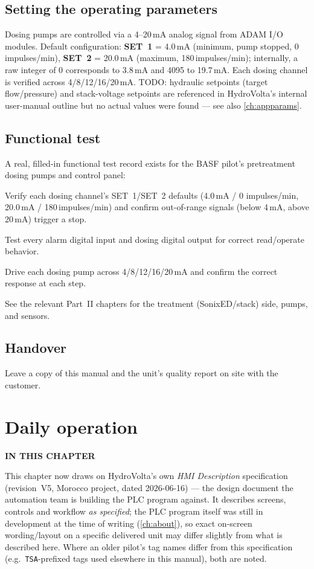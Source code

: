 \documentclass[a4paper,11pt,twoside,openright,numbers=noenddot]{scrreprt}
\newcommand{\chaptertoc}{%
  \begingroup
  \etocsetnexttocdepth{1}%
  \etocsettocstyle
    {{\sffamily\bfseries\footnotesize\color{hvmuted}IN THIS CHAPTER\par}%
     \vspace{5pt}{\color{hvink}\rule{\linewidth}{1.2pt}}\par\vspace{2pt}}{}%
  \etocsetstyle{section}{}{}
    {\par\vspace{4pt}\noindent
     \makebox[11mm][l]{\sffamily\bfseries\small\color{hvprimary}\etocnumber}%
     \sffamily\small\etocname\hfill{\color{hvmuted}\etocpage}%
     \par\vspace{4pt}{\color{hvrule}\rule{\linewidth}{0.4pt}}}{}%
  \localtableofcontents
  \endgroup}
\newcommand{\sonixed}{SonixED\texttrademark\xspace}
\begin{document}
\section{Setting the operating parameters}
\label{sec:opparams}
Dosing pumps are controlled via a 4--20\,mA analog signal from ADAM I/O
modules. Default configuration: \textbf{SET~1} = 4.0\,mA (minimum, pump
stopped, 0 impulses/min), \textbf{SET~2} = 20.0\,mA (maximum,
180\,impulses/min); internally, a raw integer of 0 corresponds to 3.8\,mA
and 4095 to 19.7\,mA. Each dosing channel is verified across 4/8/12/16/20\,mA.
TODO: hydraulic setpoints (target flow/pressure) and stack-voltage
setpoints are referenced in HydroVolta's internal user-manual outline but
no actual values were found --- see also \cref{ch:appparams}.

\section{Functional test}
A real, filled-in functional test record exists for the BASF pilot's
pretreatment dosing pumps and control panel:
\begin{procedure}
\item Verify each dosing channel's SET~1/SET~2 defaults (4.0\,mA / 0
  impulses/min, 20.0\,mA / 180\,impulses/min) and confirm out-of-range
  signals (below 4\,mA, above 20\,mA) trigger a stop.
\item Test every alarm digital input and dosing digital output for correct
  read/operate behavior.
\item Drive each dosing pump across 4/8/12/16/20\,mA and confirm the
  correct response at each step.
\end{procedure}
See the relevant Part~II chapters for the treatment (\sonixed/stack) side,
pumps, and sensors.

\section{Handover}
Leave a copy of this manual and the unit's quality report on site with
the customer.


\chapter{Daily operation}
\label{ch:operation}
\chaptertoc

\begin{note}
This chapter now draws on HydroVolta's own \emph{HMI Description}
specification (revision~V5, Morocco project, dated 2026-06-16) --- the
design document the automation team is building the PLC program against.
It describes screens, controls and workflow \emph{as specified}; the PLC
program itself was still in development at the time of writing
(\cref{ch:about}), so exact on-screen wording/layout on a specific
delivered unit may differ slightly from what is described here. Where an
older pilot's tag names differ from this specification (e.g.\
\texttt{TSA}-prefixed tags used elsewhere in this manual), both are noted.
\end{note}
\end{document}
